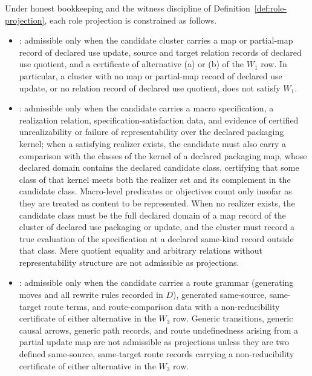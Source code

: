 \begin{proposition}\label{prop:alignment-rules}
Under honest bookkeeping and the witness discipline of
Definition~\ref{def:role-projection}, each role projection is
constrained as follows.
\begin{itemize}[topsep=2pt,itemsep=1pt]
  \item \Pone{}: admissible only when the candidate cluster carries a map or partial-map record of declared use update, source and target relation records of declared use quotient, and a certificate of alternative (a) or (b) of the \(W_1\) row. In particular, a cluster with no map or partial-map record
    of declared use update, or no relation record of declared use quotient,
    does not satisfy \(W_1\).
  \item \Ptwo{}: admissible only when the candidate carries a macro
    specification, a realization relation, specification-satisfaction
    data, and evidence of certified unrealizability or failure of
    representability over the declared packaging kernel; when a
    satisfying realizer exists, the candidate must also carry a comparison
    with the classes of the kernel of a declared packaging map, whose
    declared domain contains the declared candidate class, certifying
    that some class of that kernel meets both the realizer set and its
    complement in the candidate class.
    Macro-level predicates or objectives count only insofar as they are
    treated as content to be represented. When no realizer exists, the candidate class must be the full declared domain of a map record of the cluster of declared use packaging or update, and the cluster must record a true evaluation of the specification at a declared same-kind record outside that class. Mere quotient equality and
    arbitrary relations without representability structure are not
    admissible as \Ptwo{} projections.
  \item \Pthree{}: admissible only when the candidate carries a route
    grammar (generating moves and all rewrite rules recorded in \(D\)), generated same-source, same-target route terms, and
    route-comparison data with a non-reducibility certificate of either
alternative in the \(W_3\) row. Generic transitions, generic causal arrows, generic
    path records, and route undefinedness arising from a partial update
    map are not admissible as \Pthree{} projections unless they are
    two defined same-source, same-target route records carrying a
    non-reducibility certificate of either alternative in the \(W_3\) row.

\end{itemize}
\end{proposition}
